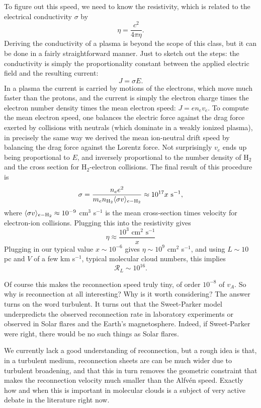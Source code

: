 To figure out this speed, we need to know the resistivity, which is related to the electrical conductivity $\sigma$ by
\begin{equation}
\eta = \frac{c^2}{4\pi \eta}.
\end{equation}
Deriving the conductivity of a plasma is beyond the scope of this class, but it can be done in a fairly straightforward manner. Just to sketch out the steps: the conductivity is simply the proportionality constant between the applied electric field and the resulting current:
\begin{equation}
J = \sigma E.
\end{equation}
In a plasma the current is carried by motions of the electrons, which move much faster than the protons, and the current is simply the electron charge times the electron number density times the mean electron speed: $J = e n_e v_e$. To compute the mean electron speed, one balances the electric force against the drag force exerted by collisions with neutrals (which dominate in a weakly ionized plasma), in precisely the same way we derived the mean ion-neutral drift speed by balancing the drag force against the Lorentz force. Not surprisingly $v_e$ ends up being proportional to $E$, and inversely proportional to the number density of H$_2$ and the cross section for H$_2$-electron collisions. The final result of this procedure is
\begin{equation}
\sigma = \frac{n_e e^2}{m_e n_{\rm H_2} \langle\sigma v\rangle_{e-\rm H_2}} \approx 10^{17} x\mbox{ s}^{-1},
\end{equation}
where $\langle\sigma v\rangle_{e-\rm H_2}\approx 10^{-9}$ cm$^3$ s$^{-1}$ is the mean cross-section times velocity for electron-ion collisions. Plugging this into the resistivity gives
\begin{equation}
\eta \approx \frac{10^3\mbox{ cm}^2\mbox{ s}^{-1}}{x}
\end{equation}
Plugging in our typical value $x\sim 10^{-6}$ gives $\eta\sim 10^{9}$ cm$^2$ s$^{-1}$, and using $L\sim 10$ pc and $V$ of a few km s$^{-1}$, typical molecular cloud numbers, this implies
\begin{equation}
\mathcal{R}_L \sim 10^{16}.
\end{equation}

Of course this makes the reconnection speed truly tiny, of order $10^{-8}$ of $v_A$. So why is reconnection at all interesting? Why is it worth considering? The answer turns on the word turbulent. It turns out that the Sweet-Parker model underpredicts the observed reconnection rate in laboratory experiments or observed in Solar flares and the Earth's magnetosphere. Indeed, if Sweet-Parker were right, there would be no such things as Solar flares.

We currently lack a good understanding of reconnection, but a rough idea is that, in a turbulent medium, reconnection sheets are can be much wider due to turbulent broadening, and that this in turn removes the geometric constraint that makes the reconnection velocity much smaller than the Alfv\'{e}n speed. Exactly how and when this is important in molecular clouds is a subject of very active debate in the literature right now.
